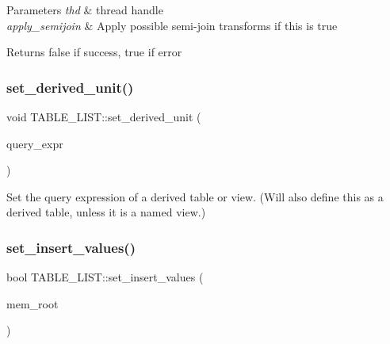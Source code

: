 \begin{DoxyParams}{Parameters}
{\em thd} & thread handle \\
\hline
{\em apply\+\_\+semijoin} & Apply possible semi-\/join transforms if this is true\\
\hline
\end{DoxyParams}
\begin{DoxyReturn}{Returns}
false if success, true if error 
\end{DoxyReturn}
\mbox{\label{structTABLE__LIST_aac72f56177ececd8ad3cc4254face1b1}} 
\subsubsection{\texorpdfstring{set\+\_\+derived\+\_\+unit()}{set\_derived\_unit()}}
{\footnotesize\ttfamily void T\+A\+B\+L\+E\+\_\+\+L\+I\+S\+T\+::set\+\_\+derived\+\_\+unit (\begin{DoxyParamCaption}\item[{st\+\_\+select\+\_\+lex\+\_\+unit $\ast$}]{query\+\_\+expr }\end{DoxyParamCaption})\hspace{0.3cm}{\ttfamily [inline]}}

Set the query expression of a derived table or view. (Will also define this as a derived table, unless it is a named view.) \mbox{\label{structTABLE__LIST_a6927ca9c8af85e8c97148794e08cc641}} 
\subsubsection{\texorpdfstring{set\+\_\+insert\+\_\+values()}{set\_insert\_values()}}
{\footnotesize\ttfamily bool T\+A\+B\+L\+E\+\_\+\+L\+I\+S\+T\+::set\+\_\+insert\+\_\+values (\begin{DoxyParamCaption}\item[{M\+E\+M\+\_\+\+R\+O\+OT $\ast$}]{mem\+\_\+root }\end{DoxyParamCaption})}



